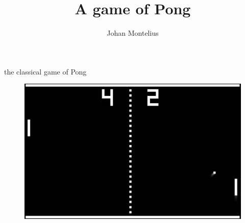 

\usepackage{pgf-umlsd}

\title[ID1019 A transport layer]{A game of Pong}


\author{Johan Montelius}
\date{\semester}



\begin{frame}
\titlepage
\end{frame}

\begin{frame}{the classical game of Pong}

  \begin{figure}
    \includegraphics[scale=0.4]{pong.png}
  \end{figure}
  
\end{frame}

